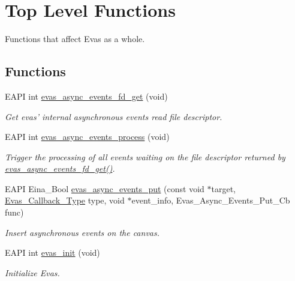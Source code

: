\section{Top Level Functions}
\label{group__Evas__Group}


Functions that affect Evas as a whole.  


\subsection*{Functions}
\begin{DoxyCompactItemize}
\item 
EAPI int \hyperlink{group__Evas__Group_ga7e59dbbc6b37d4ce63bea067851ceedd}{evas\_\-async\_\-events\_\-fd\_\-get} (void)
\begin{DoxyCompactList}\small\item\em Get evas' internal asynchronous events read file descriptor. \item\end{DoxyCompactList}\item 
EAPI int \hyperlink{group__Evas__Group_ga9f99c6cd0bf0621bdd61d1085999ef47}{evas\_\-async\_\-events\_\-process} (void)
\begin{DoxyCompactList}\small\item\em Trigger the processing of all events waiting on the file descriptor returned by \hyperlink{group__Evas__Group_ga7e59dbbc6b37d4ce63bea067851ceedd}{evas\_\-async\_\-events\_\-fd\_\-get()}. \item\end{DoxyCompactList}\item 
EAPI Eina\_\-Bool \hyperlink{group__Evas__Group_ga5c1059b55fbca7f55037c4ce52d5d6ca}{evas\_\-async\_\-events\_\-put} (const void $\ast$target, \hyperlink{Evas_8h_a076b2a9b2de2b2144a4193b1d12ed448}{Evas\_\-Callback\_\-Type} type, void $\ast$event\_\-info, Evas\_\-Async\_\-Events\_\-Put\_\-Cb func)
\begin{DoxyCompactList}\small\item\em Insert asynchronous events on the canvas. \item\end{DoxyCompactList}\item 
EAPI int \hyperlink{group__Evas__Group_ga939a904ec53bf80796a8ad763cbb4c3c}{evas\_\-init} (void)
\begin{DoxyCompactList}\small\item\em Initialize Evas. \item\end{DoxyCompactList}\item 

\end{DoxyCompactItemize}
